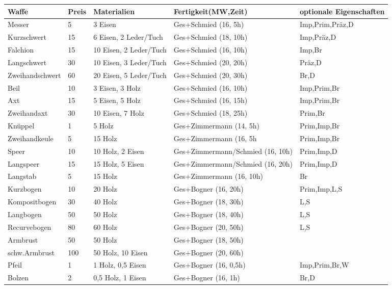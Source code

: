 \documentclass{article}
\begin{document}
\begin{small}
\begin{tabular}{|m{25mm}|m{1cm}|m{40mm}|m{40mm}|m{30mm}|}
\hline
\textbf{Waffe}&\textbf{Preis}&\textbf{Materialien}&\textbf{Fertigkeit(MW,Zeit)}&\textbf{optionale Eigenschaften}\\
\hline
\hline
Messer&5&3 Eisen&Ges+Schmied (16, 5h)&Imp,Prim,Präz,D\\
\hline
Kurzschwert&15&6 Eisen, 2 Leder/Tuch&Ges+Schmied (18, 10h)&Imp,Präz,D\\
\hline
Falchion&15&10 Eisen, 2 Leder/Tuch&Ges+Schmied (16, 10h)&Imp,Br\\
\hline
Langschwert&30&10 Eisen, 3 Leder/Tuch&Ges+Schmied (20, 20h)&Präz,D\\
\hline
Zweihandschwert&60&20 Eisen, 5 Leder/Tuch&Ges+Schmied (20, 30h)&Br,D\\
\hline
Beil&10&3 Eisen, 3 Holz&Ges+Schmied (16, 10h)&Imp,Prim,Br\\
\hline
Axt&15&5 Eisen, 5 Holz&Ges+Schmied (16, 15h)&Imp,Prim,Br\\
\hline
Zweihandaxt&30&10 Eisen, 7 Holz&Ges+Schmied (18, 25h)&Prim,Br\\
\hline
Knüppel&1&5 Holz&Ges+Zimmermann (14, 5h)&Prim,Imp,Br\\
\hline
Zweihandkeule&5&15 Holz&Ges+Zimmermann (16, 5h&Prim,Imp,Br\\
\hline
Speer&10&10 Holz, 2 Eisen&Ges+Zimmermann/Schmied (16, 10h)&Prim,Imp,D\\
\hline
Langspeer&15&15 Holz, 5 Eisen&Ges+Zimmermann/Schmied (16, 20h)&Prim,Imp,D\\
\hline
Langstab&5&15 Holz&Ges+Zimmermann (16, 10h)&Br\\
\hline
Kurzbogen&10&20 Holz&Ges+Bogner (16, 20h)&Prim,Imp,L,S\\
\hline
Kompositbogen&30&40 Holz&Ges+Bogner (18, 30h)&L,S\\
\hline
Langbogen&50&50 Holz&Ges+Bogner (18, 40h)&L,S\\
\hline
Recurvebogen&80&60 Holz&Ges+Bogner (20, 50h)&L,S\\
\hline
Armbrust&50&50 Holz&Ges+Bogner (18, 50h)& \\
\hline
schw.Armbrust&100&50 Holz, 10 Eisen&Ges+Bogner (20, 60h)& \\
\hline
Pfeil&1&1 Holz, 0,5 Eisen&Ges+Bogner (16, 0,5h)&Imp,Prim,Br,W\\
\hline
Bolzen&2&0,5 Holz, 1 Eisen&Ges+Bogner (16, 1h)&Br,D\\
\hline
\end{tabular}
\end{small}
\end{document}
